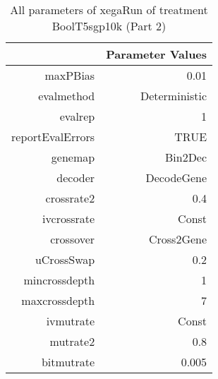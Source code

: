 \begin{table}[ht]
\centering
\begin{tabular}{rr}
  \hline
 & Parameter Values \\ 
  \hline
maxPBias & 0.01 \\ 
  evalmethod & Deterministic \\ 
  evalrep & 1 \\ 
  reportEvalErrors & TRUE \\ 
  genemap & Bin2Dec \\ 
  decoder & DecodeGene \\ 
  crossrate2 & 0.4 \\ 
  ivcrossrate & Const \\ 
  crossover & Cross2Gene \\ 
  uCrossSwap & 0.2 \\ 
  mincrossdepth & 1 \\ 
  maxcrossdepth & 7 \\ 
  ivmutrate & Const \\ 
  mutrate2 & 0.8 \\ 
  bitmutrate & 0.005 \\ 
   \hline
\end{tabular}
\caption{ All parameters of xegaRun of treatment BoolT5sgp10k 
 (Part 2)} 
\end{table}
